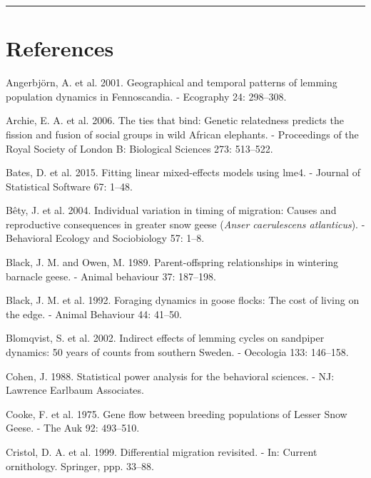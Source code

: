 \documentclass[10pt,twocolumn]{paper}
\begin{document}
\begin{center}\rule{0.5\linewidth}{\linethickness}\end{center}

\section{References}\label{references}

\small

\hypertarget{refs}{}
\hypertarget{ref-angerbjorn2001geographical}{}
Angerbjörn, A. et al. 2001. Geographical and temporal patterns of
lemming population dynamics in Fennoscandia. - Ecography 24: 298--308.

\hypertarget{ref-Archie513}{}
Archie, E. A. et al. 2006. The ties that bind: Genetic relatedness
predicts the fission and fusion of social groups in wild African
elephants. - Proceedings of the Royal Society of London B: Biological
Sciences 273: 513--522.

\hypertarget{ref-lme4}{}
Bates, D. et al. 2015. Fitting linear mixed-effects models using lme4. -
Journal of Statistical Software 67: 1--48.

\hypertarget{ref-Buxeaty2004}{}
Bêty, J. et al. 2004. Individual variation in timing of migration:
Causes and reproductive consequences in greater snow geese (\emph{Anser
caerulescens atlanticus}). - Behavioral Ecology and Sociobiology 57:
1--8.

\hypertarget{ref-black1989parent}{}
Black, J. M. and Owen, M. 1989. Parent-offspring relationships in
wintering barnacle geese. - Animal behaviour 37: 187--198.

\hypertarget{ref-black1992foraging}{}
Black, J. M. et al. 1992. Foraging dynamics in goose flocks: The cost of
living on the edge. - Animal Behaviour 44: 41--50.

\hypertarget{ref-blomqvist2002indirect}{}
Blomqvist, S. et al. 2002. Indirect effects of lemming cycles on
sandpiper dynamics: 50 years of counts from southern Sweden. - Oecologia
133: 146--158.

\hypertarget{ref-cohen1988statistical}{}
Cohen, J. 1988. Statistical power analysis for the behavioral sciences.
- NJ: Lawrence Earlbaum Associates.

\hypertarget{ref-cooke1975gene}{}
Cooke, F. et al. 1975. Gene flow between breeding populations of Lesser
Snow Geese. - The Auk 92: 493--510.

\hypertarget{ref-cristol1999differential}{}
Cristol, D. A. et al. 1999. Differential migration revisited. - In:
Current ornithology. Springer, ppp. 33--88.
\end{document}
